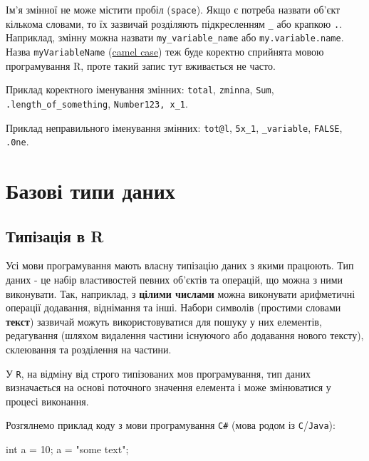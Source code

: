 \documentclass[
]{book}
\newenvironment{Shaded}{\begin{snugshade}}{\end{snugshade}}
\newcommand{\DataTypeTok}[1]{\textcolor[rgb]{0.13,0.29,0.53}{#1}}
\newcommand{\DecValTok}[1]{\textcolor[rgb]{0.00,0.00,0.81}{#1}}
\newcommand{\NormalTok}[1]{#1}
\newcommand{\StringTok}[1]{\textcolor[rgb]{0.31,0.60,0.02}{#1}}
\begin{document}
Ім'я змінної не може містити пробіл (\texttt{space}). Якщо є потреба назвати об'єкт кількома словами, то їх зазвичай розділяють підкресленням \texttt{\_} або крапкою \texttt{.}. Наприклад, змінну можна назвати \texttt{my\_variable\_name} або \texttt{my.variable.name}. Назва \texttt{myVariableName} (\href{https://en.wikipedia.org/wiki/Camel_case}{camel case}) теж буде коректно сприйнята мовою програмування R, проте такий запис тут вживається не часто.

{Приклад коректного іменування змінних:} \texttt{total}, \texttt{zminna}, \texttt{Sum}, \texttt{.length\_of\_something}, \texttt{Number123,\ x\_1}.

{Приклад неправильного іменування змінних:} \texttt{tot@l}, \texttt{5x\_1}, \texttt{\_variable}, \texttt{FALSE}, \texttt{.0ne}.

\hypertarget{chapter22}{%
\section{Базові типи даних}\label{chapter22}}

\hypertarget{chapter221}{%
\subsection{Типізація в R}\label{chapter221}}

Усі мови програмування мають власну типізацію даних з якими працюють. Тип даних - це набір властивостей певних об'єктів та операцій, що можна з ними виконувати. Так, наприклад, з \textbf{цілими числами} можна виконувати арифметичні операції додавання, віднімання та інші. Набори символів (простими словами \textbf{текст}) зазвичай можуть використовуватися для пошуку у них елементів, редагування (шляхом видалення частини існуючого або додавання нового тексту), склеювання та розділення на частини.

У \texttt{R}, на відміну від строго типізованих мов програмування, тип даних визначається на основі поточного значення елемента і може змінюватися у процесі виконання.

Розгялнемо приклад коду з мови програмування \texttt{C\#} (мова родом із \texttt{C}/\texttt{Java}):

\begin{Shaded}
\begin{Highlighting}[]
\DataTypeTok{int}\NormalTok{ a = }\DecValTok{10}\NormalTok{;}
\NormalTok{a = }\StringTok{"some text"}\NormalTok{;}
\end{Highlighting}
\end{Shaded}
\end{document}
